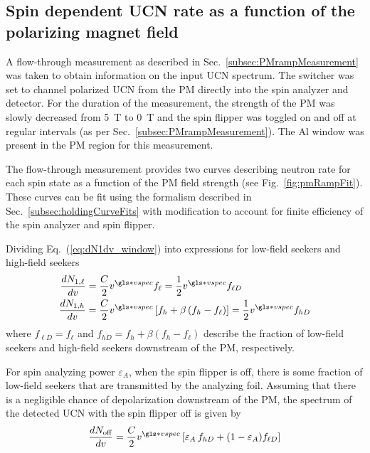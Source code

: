 
\subsection{\label{subsec:PMramp}Spin dependent UCN rate as a function of the polarizing magnet field}


A flow-through measurement as described in Sec.~\ref{subsec:PMrampMeasurement} was taken to obtain information on the input UCN spectrum. The switcher was set to channel polarized UCN from the PM directly into the spin analyzer and detector. For the duration of the measurement, the strength of the PM was slowly decreased from 5~T to 0~T and the spin flipper was toggled on and off at regular intervals (as per Sec.~\ref{subsec:PMrampMeasurement}). The Al window was present in the PM region for this measurement.

The flow-through measurement provides two curves describing neutron rate for each spin state as a function of the PM field strength (see Fig.~\ref{fig:pmRampFit}). These curves can be fit using the formalism described in Sec.~\ref{subsec:holdingCurveFits} with modification to account for finite efficiency of the spin analyzer and spin flipper.

Dividing Eq.~(\ref{eq:dN1dv_window}) into expressions for low-field seekers and high-field seekers
%
\begin{align}
\frac{dN_{1,\ell}}{dv} &= \frac{C}{2}v^{\gls*{vspec}} f_\ell = \frac{1}{2}v^{\gls*{vspec}} f_{\ell D}\\
\frac{dN_{1,h}}{dv} &= \frac{C}{2}v^{\gls*{vspec}} \left[ f_h + \beta \left( f_h - f_\ell \right)  \right] = \frac{1}{2}v^{\gls*{vspec}} f_{h D}
\end{align}
%
where $f_{\ell D} = f_\ell$ and $f_{h D} = f_h +  \beta \left( f_h - f_\ell \right)$  describe the fraction of low-field seekers and high-field seekers downstream of the  PM, respectively.

For spin analyzing power $\varepsilon_A$, when the spin flipper is off, there is some fraction of low-field seekers that are transmitted by the analyzing foil. Assuming that there is a negligible chance of depolarization downstream of the PM, the spectrum of the detected UCN with the spin flipper off is given by
%
\begin{gather}
    \frac{dN_\text{off}}{dv} = \frac{C}{2} v^{\gls*{vspec}} \left[ \varepsilon_A\, f_{h D} + (1-\varepsilon_A)f_{\ell D}  \right]
    \label{eq:dN_off/dv}
\end{gather}

